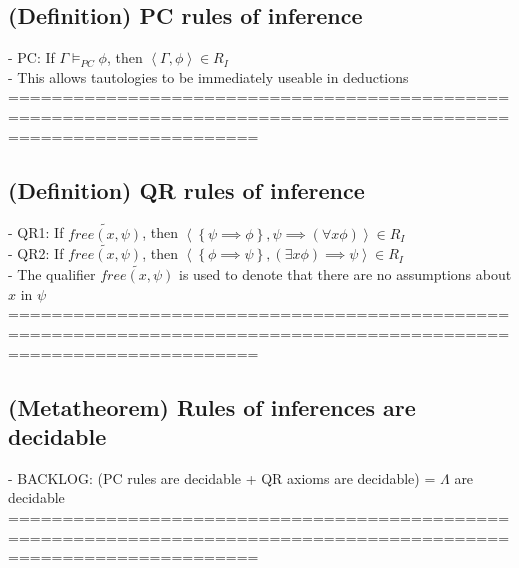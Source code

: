 \documentclass{book}
\newcommand{\pnot}[1]{\widetilde{#1}}
\newcommand{\free}[2]{free(#1, #2)}
\newcommand{\set}[1]{\left\{ #1 \right\}}
\newcommand{\seq}[1]{\left\langle #1 \right\rangle}
\begin{document}
\subsection{(Definition) PC rules of inference} %
	- PC: If $\Gamma \vDash_{PC} \phi$, then $\seq{\Gamma, \phi} \in R_I$ \\
	- This allows tautologies to be immediately useable in deductions \\
	===================================================================================================================
\subsection{(Definition) QR rules of inference} %
	- QR1: If $\pnot{\free{x}{\psi}}$, then $\seq{\set{\psi \implies \phi}, \psi \implies (\forall x \phi)} \in R_I$ \\
	- QR2: If $\pnot{\free{x}{\psi}}$, then $\seq{\set{\phi \implies \psi}, (\exists x \phi) \implies \psi} \in R_I$ \\
	- The qualifier $\pnot{\free{x}{\psi}}$ is used to denote that there are no assumptions about $x$ in $\psi$ \\
		===================================================================================================================
\subsection{(Metatheorem) Rules of inferences are decidable} %
	- BACKLOG: (PC rules are decidable + QR axioms are decidable) = $\Lambda$ are decidable \\
	===================================================================================================================
\end{document}
